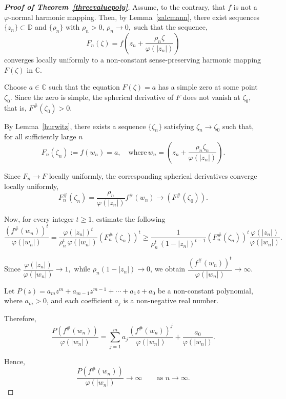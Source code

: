 \documentclass[11pt, reqno]{amsart}
\numberwithin{equation}{section}
\theoremstyle{definition}
\theoremstyle{remark}
\theoremstyle{plain}
\begin{document}
\medskip

\begin{proof}[\bf{Proof of Theorem~\ref{threevaluepoly}}]
  
Assume, to the contrary, that $f$ is not a $\varphi$-normal harmonic
mapping. Then, by Lemma~\ref{zalcmann}, there exist sequences
$\{z_n\}\subset\mathbb D$ and $\{\rho_n\}$ with $\rho_n>0,\,
\rho_n\longrightarrow0,$
such that the sequence,
\[
F_n(\zeta)
=
f\!\left(
z_n+\frac{\rho_n\zeta}{\varphi(|z_n|)}
\right)
\]
converges locally uniformly to a
non-constant sense-preserving harmonic mapping
$F(\zeta)$ in $\mathbb C$.

Choose $a\in \mathbb{C}$ such that the equation $F(\zeta)=a$
has a simple zero at some point $\zeta_0$.
Since the zero is simple, the spherical derivative of $F$
does not vanish at $\zeta_0$, that is,
$F^{\#}(\zeta_0)>0$.

By Lemma~\ref{hurwitz}, 
there exists a sequence $\{\zeta_n\}$ satisfying
$\zeta_n\rightarrow\zeta_0$
such that, for all sufficiently large $n$
\[F_n(\zeta_n):=f(w_n)=a, \quad \text{where}\, w_n=\!\left(
z_n+\frac{\rho_n\zeta_n}{\varphi(|z_n|)}
\right).\]

Since $F_n\to F$ locally uniformly,
the corresponding spherical derivatives converge locally
uniformly, 
\[
F_n^{\#}(\zeta_n)
=
\frac{\rho_n}{\varphi(|z_n|)}
f^{\#}(w_n)\longrightarrow
\left(F^{\#}(\zeta_0)\right).
\]

Now, for every integer $t\ge1$, estimate the following
\[
  \frac{\left(f^{\#}(w_n)\right)^t}
{\varphi(|w_n|)} =\frac{\varphi(|z_n|)^t}
{\rho_n^t\,\varphi(|w_n|)}
\left(F_n^{\#}(\zeta_n)\right)^t
  \geq \frac{1}
{\rho_n^t\,(1-|z_n|)^{t-1}}\left(F_n^{\#}(\zeta_n)\right)^t 
\frac{\varphi(|z_n|)}
{\varphi(|w_n|)}.
\]

Since $
\dfrac{\varphi(|z_n|)}
{\varphi(|w_n|)}
\longrightarrow1,
$
while $\rho_n(1-|z_n|)\longrightarrow 0$,
we obtain $
\dfrac{\left(f^{\#}(w_n)\right)^t}
{\varphi(|w_n|)}
\longrightarrow\infty.$\smallskip

Let
$
P(z)=a_mz^m+a_{m-1}z^{m-1}+\cdots+a_1z+a_0$ be a non-constant polynomial,
where $a_m>0$, and each coefficient $a_j$ is a
non-negative real number.\smallskip

Therefore,
\[
\frac{P\!\left(f^{\#}(w_n)\right)}
{\varphi(|w_n|)}
=
\sum_{j=1}^{m}
a_j
\frac{\left(f^{\#}(w_n)\right)^j}
{\varphi(|w_n|)}
+
\frac{a_0}{\varphi(|w_n|)}.
\]

Hence,
\[
\frac{P\!\left(f^{\#}(w_n)\right)}
{\varphi(|w_n|)}
\longrightarrow\infty
\qquad\text{as }n\to\infty.
\]


\end{proof}
\end{document}
